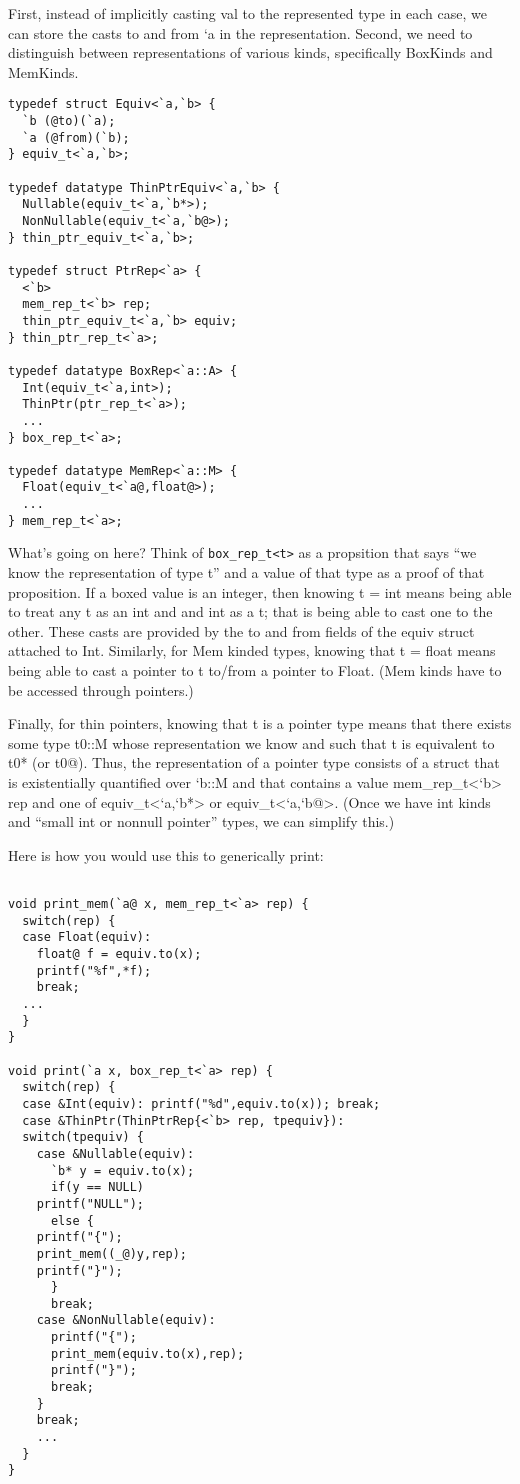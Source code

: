 First, instead of implicitly casting val to the represented type in each case, we can store the casts to and from `a in the representation.  Second, we need to distinguish between representations of various kinds, specifically BoxKinds and MemKinds.

\begin{verbatim} 
typedef struct Equiv<`a,`b> {
  `b (@to)(`a);
  `a (@from)(`b);
} equiv_t<`a,`b>;

typedef datatype ThinPtrEquiv<`a,`b> {
  Nullable(equiv_t<`a,`b*>);
  NonNullable(equiv_t<`a,`b@>);
} thin_ptr_equiv_t<`a,`b>;

typedef struct PtrRep<`a> {
  <`b> 
  mem_rep_t<`b> rep;
  thin_ptr_equiv_t<`a,`b> equiv;
} thin_ptr_rep_t<`a>;

typedef datatype BoxRep<`a::A> {
  Int(equiv_t<`a,int>);
  ThinPtr(ptr_rep_t<`a>);
  ...
} box_rep_t<`a>;

typedef datatype MemRep<`a::M> {
  Float(equiv_t<`a@,float@>);
  ...
} mem_rep_t<`a>;
\end{verbatim}

What's going on here?  Think of \texttt{box\_rep\_t<t>} as a propsition that says ``we know the representation of type t'' and a value of that type as a proof of that proposition.  If a boxed value is an integer, then knowing t = int means being able to treat any t as an int and and int as a t; that is being able to cast one to the other.  These casts are provided by the to and from fields of the equiv struct attached to Int.  Similarly, for Mem kinded types, knowing that t = float means being able to cast a pointer to t to/from a pointer to Float.  (Mem kinds have to be accessed through pointers.)

Finally, for thin pointers, knowing that t is a pointer type means that there exists some type t0::M whose representation we know and such that t is equivalent to t0* (or t0@).  Thus, the representation of a pointer type consists of a struct that is existentially quantified over `b::M and that contains a value mem_rep_t<`b> rep and one of equiv_t<`a,`b*> or equiv_t<`a,`b@>.  (Once we have int kinds and ``small int or nonnull pointer'' types, we can simplify this.)

Here is how you would use this to generically print:

\begin{verbatim}

void print_mem(`a@ x, mem_rep_t<`a> rep) {
  switch(rep) {
  case Float(equiv): 
    float@ f = equiv.to(x);
    printf("%f",*f);
    break;
  ...
  }
}

void print(`a x, box_rep_t<`a> rep) {
  switch(rep) {
  case &Int(equiv): printf("%d",equiv.to(x)); break;
  case &ThinPtr(ThinPtrRep{<`b> rep, tpequiv}):
  switch(tpequiv) {
    case &Nullable(equiv): 
      `b* y = equiv.to(x);
      if(y == NULL) 
	printf("NULL");
      else { 
	printf("{");
	print_mem((_@)y,rep);
	printf("}");
      }
      break;
    case &NonNullable(equiv):
      printf("{");
      print_mem(equiv.to(x),rep);
      printf("}");
      break;
    }
    break;
    ...
  }
}
\end{verbatim}

